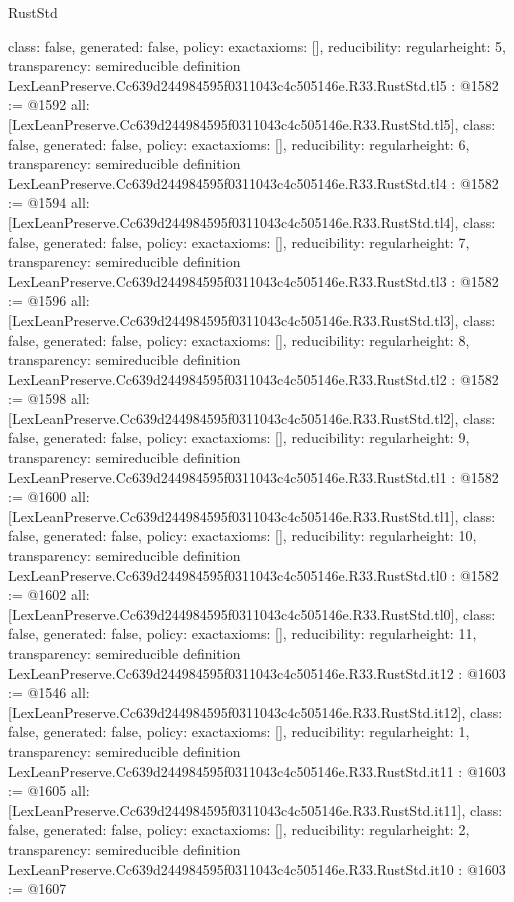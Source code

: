 \begin{lexlean}{RustStd}
\begin{coremodule}
{  class: false,
  generated: false,
  policy: exact{axioms: []},
  reducibility: regular{height: 5},
  transparency: semireducible
}
definition LexLeanPreserve.Cc639d244984595f0311043c4c505146e.R33.RustStd.tl5 : @1582 := @1592 {
  all: [LexLeanPreserve.Cc639d244984595f0311043c4c505146e.R33.RustStd.tl5],
  class: false,
  generated: false,
  policy: exact{axioms: []},
  reducibility: regular{height: 6},
  transparency: semireducible
}
definition LexLeanPreserve.Cc639d244984595f0311043c4c505146e.R33.RustStd.tl4 : @1582 := @1594 {
  all: [LexLeanPreserve.Cc639d244984595f0311043c4c505146e.R33.RustStd.tl4],
  class: false,
  generated: false,
  policy: exact{axioms: []},
  reducibility: regular{height: 7},
  transparency: semireducible
}
definition LexLeanPreserve.Cc639d244984595f0311043c4c505146e.R33.RustStd.tl3 : @1582 := @1596 {
  all: [LexLeanPreserve.Cc639d244984595f0311043c4c505146e.R33.RustStd.tl3],
  class: false,
  generated: false,
  policy: exact{axioms: []},
  reducibility: regular{height: 8},
  transparency: semireducible
}
definition LexLeanPreserve.Cc639d244984595f0311043c4c505146e.R33.RustStd.tl2 : @1582 := @1598 {
  all: [LexLeanPreserve.Cc639d244984595f0311043c4c505146e.R33.RustStd.tl2],
  class: false,
  generated: false,
  policy: exact{axioms: []},
  reducibility: regular{height: 9},
  transparency: semireducible
}
definition LexLeanPreserve.Cc639d244984595f0311043c4c505146e.R33.RustStd.tl1 : @1582 := @1600 {
  all: [LexLeanPreserve.Cc639d244984595f0311043c4c505146e.R33.RustStd.tl1],
  class: false,
  generated: false,
  policy: exact{axioms: []},
  reducibility: regular{height: 10},
  transparency: semireducible
}
definition LexLeanPreserve.Cc639d244984595f0311043c4c505146e.R33.RustStd.tl0 : @1582 := @1602 {
  all: [LexLeanPreserve.Cc639d244984595f0311043c4c505146e.R33.RustStd.tl0],
  class: false,
  generated: false,
  policy: exact{axioms: []},
  reducibility: regular{height: 11},
  transparency: semireducible
}
definition LexLeanPreserve.Cc639d244984595f0311043c4c505146e.R33.RustStd.it12 : @1603 := @1546 {
  all: [LexLeanPreserve.Cc639d244984595f0311043c4c505146e.R33.RustStd.it12],
  class: false,
  generated: false,
  policy: exact{axioms: []},
  reducibility: regular{height: 1},
  transparency: semireducible
}
definition LexLeanPreserve.Cc639d244984595f0311043c4c505146e.R33.RustStd.it11 : @1603 := @1605 {
  all: [LexLeanPreserve.Cc639d244984595f0311043c4c505146e.R33.RustStd.it11],
  class: false,
  generated: false,
  policy: exact{axioms: []},
  reducibility: regular{height: 2},
  transparency: semireducible
}
definition LexLeanPreserve.Cc639d244984595f0311043c4c505146e.R33.RustStd.it10 : @1603 := @1607 {
}
\end{coremodule}
\end{lexlean}
